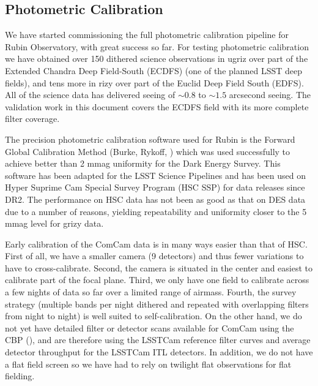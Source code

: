 \subsection{Photometric Calibration}
\label{sec:photometric_calibration}

We have started commissioning the full photometric calibration pipeline for
Rubin Observatory, with great success so far. For testing photometric
calibration we have obtained over 150 dithered science observations in ugriz
over part of the Extended Chandra Deep Field-South (ECDFS) (one of the planned LSST
deep fields), and tens more in rizy over part of the Euclid Deep Field South
(EDFS). All of the science data has delivered seeing of $\sim0.8$ to $\sim1.5$
arcsecond seeing.  The
validation work in this document covers the ECDFS field with its more complete
filter coverage.

The precision photometric calibration software used for Rubin is the Forward
Global Calibration Method (Burke, Rykoff, ) which was used
successfully to achieve better than 2 mmag uniformity for the Dark Energy
Survey. This software has been adapted for the LSST Science Pipelines and has
been used on Hyper Suprime Cam Special Survey Program (HSC SSP) for data
releases since DR2.
The performance on HSC data has not been as good as that on DES data due to a
number of reasons, yielding repeatability and uniformity closer to the 5 mmag
level for grizy data.

Early calibration of the ComCam data is in many ways easier than that of HSC.
First of all, we have a smaller camera (9 detectors) and thus fewer variations
to have to cross-calibrate.  Second, the camera is situated in the center and
easiest to calibrate part of the focal plane.  Third, we only have one field to
calibrate across a few nights of data so far over a limited range of airmass.
Fourth, the survey strategy (multiple bands per night dithered and repeated
with overlapping filters from night to night) is well suited to
self-calibration.  On the other hand, we do not yet have
detailed filter or detector scans available for ComCam using the CBP (), and are
therefore using the LSSTCam reference filter curves and average detector
throughput for the LSSTCam ITL detectors.  In addition, we do not have a flat
field screen so we have had to rely on twilight flat observations for flat fielding.

